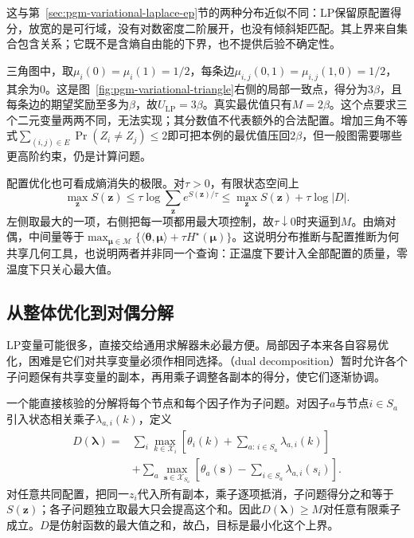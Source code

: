 这与第~\ref{sec:pgm-variational-laplace-ep}节的两种分布近似不同：LP保留原配置得分，放宽的是可行域，没有对数密度二阶展开，也没有倾斜矩匹配。其上界来自集合包含关系；它既不是含熵自由能的下界，也不提供后验不确定性。

三角图中，取$\mu_i(0)=\mu_i(1)=1/2$，每条边$\mu_{i,j}(0,1)=\mu_{i,j}(1,0)=1/2$，其余为$0$。这是图~\ref{fig:pgm-variational-triangle}右侧的局部一致点，得分为$3\beta$，且每条边的期望奖励至多为$\beta$，故$U_{\mathrm{LP}}=3\beta$。真实最优值只有$M=2\beta$。这个点要求三个二元变量两两不同，无法实现；其分数值不代表额外的合法配置。增加三角不等式$\sum_{(i,j)\in E}\Pr(Z_i\ne Z_j)\leq2$即可把本例的最优值压回$2\beta$，但一般图需要哪些更高阶约束，仍是计算问题。

配置优化也可看成熵消失的极限。对$\tau>0$，有限状态空间上
\[
  \max_{\bm z}S(\bm z)
  \leq \tau\log\sum_{\bm z}e^{S(\bm z)/\tau}
  \leq \max_{\bm z}S(\bm z)+\tau\log|D|.
\]
左侧取最大的一项，右侧把每一项都用最大项控制，故$\tau\downarrow0$时夹逼到$M$。由熵对偶，中间量等于$\max_{\bm{\mu}\in\mathcal M}\{\langle\bm{\theta},\bm{\mu}\rangle+\tau H^\star(\bm{\mu})\}$。这说明分布推断与配置推断为何共享几何工具，也说明两者并非同一个查询：正温度下要计入全部配置的质量，零温度下只关心最大值。

\subsection{从整体优化到对偶分解}
\label{sec:pgm-variational-dual-decomposition}
\label{sec:pgm-variational-dual-trw}

LP变量可能很多，直接交给通用求解器未必最方便。局部因子本来各自容易优化，困难是它们对共享变量必须作相同选择。（dual decomposition）暂时允许各个子问题保有共享变量的副本，再用乘子调整各副本的得分，使它们逐渐协调。

一个能直接核验的分解将每个节点和每个因子作为子问题。对因子$a$与节点$i\in S_a$引入状态相关乘子$\lambda_{a,i}(k)$，定义
\begin{equation}
  \begin{aligned}
    D(\bm{\lambda})
       ={}&\sum_i\max_{k\in\mathcal X_i}
          \left[\theta_i(k)+\sum_{a:\,i\in S_a}\lambda_{a,i}(k)\right]\\
        &+\sum_a\max_{\bm s\in\mathcal X_{S_a}}
          \left[\theta_a(\bm s)-\sum_{i\in S_a}\lambda_{a,i}(s_i)\right].
  \end{aligned}
  \label{eq:pgm-variational-dual}
\end{equation}
对任意共同配置，把同一$z_i$代入所有副本，乘子逐项抵消，子问题得分之和等于$S(\bm z)$；各子问题独立取最大只会提高这个和。因此$D(\bm{\lambda})\geq M$对任意有限乘子成立。$D$是仿射函数的最大值之和，故凸，目标是最小化这个上界。

